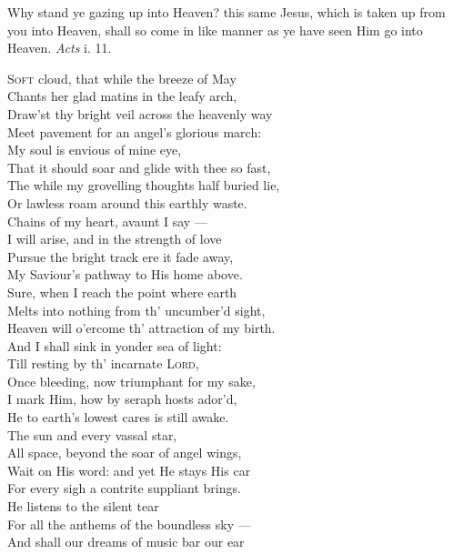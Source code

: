 
Why stand ye gazing up into Heaven? this same Jesus, which is taken up from you into Heaven, shall so come in like manner as ye have seen Him go into Heaven. \emph{Acts} i. 11.

\textsc{Soft} cloud, that while the breeze of May \\
 Chants her glad matins in the leafy arch, \\
 Draw’st thy bright veil across the heavenly way \\
 Meet pavement for an angel’s glorious march: \\
  My soul is envious of mine eye, \\
 That it should soar and glide with thee so fast, \\
 The while my grovelling thoughts half buried lie, \\
 Or lawless roam around this earthly waste. \\
  Chains of my heart, avaunt I say — \\
 I will arise, and in the strength of love \\
 Pursue the bright track ere it fade away, \\
 My Saviour’s pathway to His home above. \\
  Sure, when I reach the point where earth \\
 Melts into nothing from th’ uncumber’d sight, \\
 Heaven will o’ercome th’ attraction of my birth. \\
 And I shall sink in yonder sea of light: \\
  Till resting by th’ incarnate \textsc{Lord}, \\
 Once bleeding, now triumphant for my sake, \\
 I mark Him, how by seraph hosts ador’d, \\
 He to earth’s lowest cares is still awake. \\
  The sun and every vassal star, \\
 All space, beyond the soar of angel wings, \\
 Wait on His word: and yet He stays His car \\
 For every sigh a contrite suppliant brings. \\
  He listens to the silent tear \\
 For all the anthems of the boundless sky — \\
 And shall our dreams of music bar our ear \\

